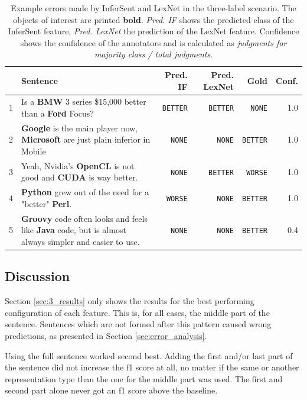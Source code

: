 \begin{table}[htbp]
\caption{Example errors made by InferSent and LexNet in the three-label scenario. The objects of interest are printed \textbf{bold}. \emph{Pred. IF} shows the predicted class of the InferSent feature, \emph{Pred. LexNet} the prediction of the LexNet feature. Confidence shows the confidence of the annotators and is calculated as \emph{judgments for majority class / total judgments}.}
\label{tbl:3_mistakes_both}
\begin{tabularx}{\linewidth}{lXrrrr}
\toprule
 & Sentence & Pred. IF & Pred. LexNet & Gold & Conf. \\ \midrule
1 & Is a \textbf{BMW} 3 series \$15,000 better than a \textbf{Ford} Focus? & \texttt{BETTER} & \texttt{BETTER} & \texttt{NONE} & 1.0\\ %

2 & \textbf{Google} is the main player now, \textbf{Microsoft} are just plain inferior in Mobile & \texttt{NONE} & \texttt{NONE} & \texttt{BETTER} & 1.0\\ %

3 & Yeah, Nvidia's \textbf{OpenCL} is not good and \textbf{CUDA} is way better. & \texttt{NONE} & \texttt{BETTER} & \texttt{WORSE} & 1.0\\ %

4 & \textbf{Python} grew out of the need for a "better" \textbf{Perl}. & \texttt{WORSE} & \texttt{NONE} & \texttt{BETTER} & 1.0\\

5 & \textbf{Groovy} code often looks and feels like \textbf{Java} code, but is almost always simpler and easier to use. & \texttt{NONE} & \texttt{NONE} & \texttt{BETTER} & 0.4\\ %

 \bottomrule
\end{tabularx}
\end{table}


\subsection{Discussion}
Section \ref{sec:3_results} only shows the results for the best performing configuration of each feature. This is, for all cases, the middle part of the sentence. Sentences which are not formed after this pattern caused wrong predictions, as presented in Section \ref{sec:error_analysis}.

Using the full sentence worked second best. Adding the first and/or last part of the sentence did not increase the f1 score at all, no matter if the same or another representation type than the one for the middle part was used. The first and second part alone never got an f1 score above the baseline.

